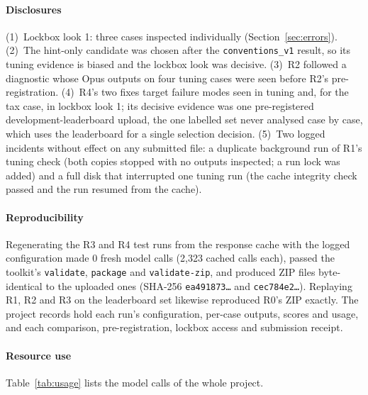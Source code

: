 \documentclass[conference]{IEEEtran}
\newcommand{\id}[1]{\texttt{#1}}
\begin{document}
\paragraph*{Disclosures}
(1)~Lockbox look 1: three cases inspected individually (Section~\ref{sec:errors}). (2)~The hint-only candidate was chosen after the \id{conventions\_v1} result, so its tuning evidence is biased and the lockbox look was decisive. (3)~R2 followed a diagnostic whose Opus outputs on four tuning cases were seen before R2's pre-registration. (4)~R4's two fixes target failure modes seen in tuning and, for the tax case, in lockbox look 1; its decisive evidence was one pre-registered development-leaderboard upload, the one labelled set never analysed case by case, which uses the leaderboard for a single selection decision. (5)~Two logged incidents without effect on any submitted file: a duplicate background run of R1's tuning check (both copies stopped with no outputs inspected; a run lock was added) and a full disk that interrupted one tuning run (the cache integrity check passed and the run resumed from the cache).

\paragraph*{Reproducibility}
Regenerating the R3 and R4 test runs from the response cache with the logged configuration made 0 fresh model calls (2,323 cached calls each), passed the toolkit's \id{validate}, \id{package} and \id{validate-zip}, and produced ZIP files byte-identical to the uploaded ones (SHA-256 \id{ea491873\ldots} and \id{cec784e2\ldots}). Replaying R1, R2 and R3 on the leaderboard set likewise reproduced R0's ZIP exactly. The project records hold each run's configuration, per-case outputs, scores and usage, and each comparison, pre-registration, lockbox access and submission receipt.

\paragraph*{Resource use}
Table~\ref{tab:usage} lists the model calls of the whole project.
\end{document}
